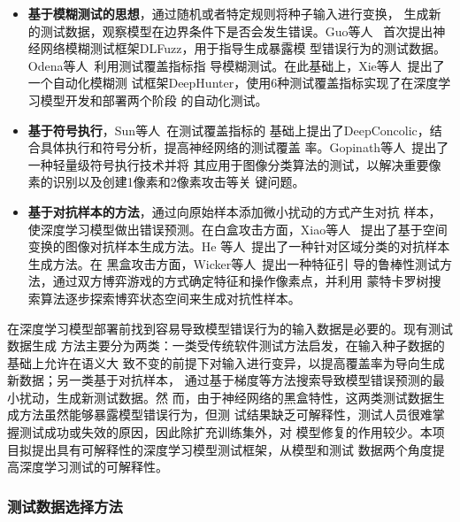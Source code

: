 \begin{itemize}
	\item \textbf{基于模糊测试的思想}，通过随机或者特定规则将种子输入进行变换，
	生成新的测试数据，观察模型在边界条件下是否会发生错误。Guo等人
	~\cite{Guo2018DLFuzz}首次提出神经网络模糊测试框架DLFuzz，用于指导生成暴露模
	型错误行为的测试数据。Odena等人~\cite{Odena2019TensorFuzz}利用测试覆盖指标指
	导模糊测试。在此基础上，Xie等人~\cite{xie2019coverage}提出了一个自动化模糊测
	试框架DeepHunter，使用6种测试覆盖指标实现了在深度学习模型开发和部署两个阶段
	的自动化测试。

	\item \textbf{基于符号执行}，Sun等人~\cite{Sun2018Concolic}在测试覆盖指标的
	基础上提出了DeepConcolic，结合具体执行和符号分析，提高神经网络的测试覆盖
	率。Gopinath等人~\cite{Gopinath2018Symbolic}提出了一种轻量级符号执行技术并将
	其应用于图像分类算法的测试，以解决重要像素的识别以及创建1像素和2像素攻击等关
	键问题。

	\item \textbf{基于对抗样本的方法}，通过向原始样本添加微小扰动的方式产生对抗
	      样本，使深度学习模型做出错误预测。在白盒攻击方面，Xiao等人
	      ~\cite{Xiao2018Spatially}提出了基于空间变换的图像对抗样本生成方法。He
	      等人~\cite{He2018Decision}提出了一种针对区域分类的对抗样本生成方法。在
	      黑盒攻击方面，Wicker等人~\cite{Wicker2018FeatureGuided}提出一种特征引
	      导的鲁棒性测试方法，通过双方博弈游戏的方式确定特征和操作像素点，并利用
	      蒙特卡罗树搜索算法逐步探索博弈状态空间来生成对抗性样本。
\end{itemize}


在深度学习模型部署前找到容易导致模型错误行为的输入数据是必要的。现有测试数据生成
方法主要分为两类：一类受传统软件测试方法启发，在输入种子数据的基础上允许在语义大
致不变的前提下对输入进行变异，以提高覆盖率为导向生成新数据；另一类基于对抗样本，
通过基于梯度等方法搜索导致模型错误预测的最小扰动，生成新测试数据。{\kaishu 然
而，由于神经网络的黑盒特性，这两类测试数据生成方法虽然能够暴露模型错误行为，但测
试结果缺乏可解释性，测试人员很难掌握测试成功或失效的原因，因此除扩充训练集外，对
模型修复的作用较少。本项目拟提出具有可解释性的深度学习模型测试框架，从模型和测试
数据两个角度提高深度学习测试的可解释性。}













\subsubsection{测试数据选择方法}


